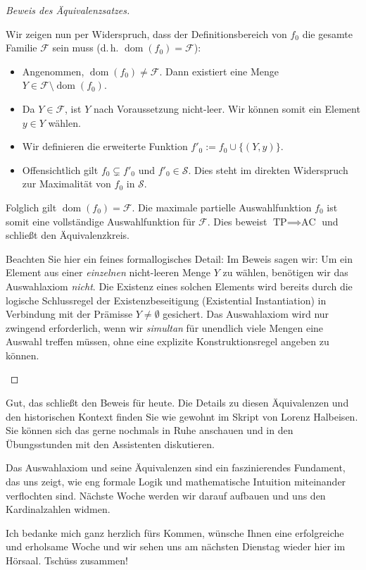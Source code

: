 \begin{proof}[Beweis des Äquivalenzsatzes]
\begin{math-stroke}
\begin{short-proof}
Wir zeigen nun per Widerspruch, dass der Definitionsbereich von $f_0$ die gesamte Familie $\mathcal{F}$ sein muss (d.\,h. $\operatorname{dom}(f_0) = \mathcal{F}$):
\begin{itemize}
    \item Angenommen, $\operatorname{dom}(f_0) \neq \mathcal{F}$. Dann existiert eine Menge $Y \in \mathcal{F} \setminus \operatorname{dom}(f_0)$.
    \item Da $Y \in \mathcal{F}$, ist $Y$ nach Voraussetzung nicht-leer. Wir können somit ein Element $y \in Y$ wählen.
    \item Wir definieren die erweiterte Funktion $f'_0 := f_0 \cup \{(Y, y)\}$.
    \item Offensichtlich gilt $f_0 \subsetneq f'_0$ und $f'_0 \in \mathcal{S}$. Dies steht im direkten Widerspruch zur Maximalität von $f_0$ in $\mathcal{S}$.
\end{itemize}
Folglich gilt $\operatorname{dom}(f_0) = \mathcal{F}$. Die maximale partielle Auswahlfunktion $f_0$ ist somit eine vollständige Auswahlfunktion für $\mathcal{F}$. Dies beweist $\text{TP} \implies \text{AC}$ und schließt den Äquivalenzkreis.
\end{short-proof}

\begin{didactic-insight}
Beachten Sie hier ein feines formallogisches Detail: Im Beweis sagen wir:  Um ein Element aus einer \emph{einzelnen} nicht-leeren Menge $Y$ zu wählen, benötigen wir das Auswahlaxiom \emph{nicht}. Die Existenz eines solchen Elements wird bereits durch die logische Schlussregel der Existenzbeseitigung (Existential Instantiation) in Verbindung mit der Prämisse $Y \neq \emptyset$ gesichert. Das Auswahlaxiom wird nur zwingend erforderlich, wenn wir \emph{simultan} für unendlich viele Mengen eine Auswahl treffen müssen, ohne eine explizite Konstruktionsregel angeben zu können.
\end{didactic-insight}
\end{math-stroke}
\end{proof}

\begin{spoken-clean}[01:28:40 - 01:29:21]
Gut, das schließt den Beweis für heute. Die Details zu diesen Äquivalenzen und den historischen Kontext finden Sie wie gewohnt im Skript von Lorenz Halbeisen. Sie können sich das gerne nochmals in Ruhe anschauen und in den Übungsstunden mit den Assistenten diskutieren.

Das Auswahlaxiom und seine Äquivalenzen sind ein faszinierendes Fundament, das uns zeigt, wie eng formale Logik und mathematische Intuition miteinander verflochten sind. Nächste Woche werden wir darauf aufbauen und uns den Kardinalzahlen widmen.

Ich bedanke mich ganz herzlich fürs Kommen, wünsche Ihnen eine erfolgreiche und erholsame Woche und wir sehen uns am nächsten Dienstag wieder hier im Hörsaal. Tschüss zusammen!
\end{spoken-clean}

